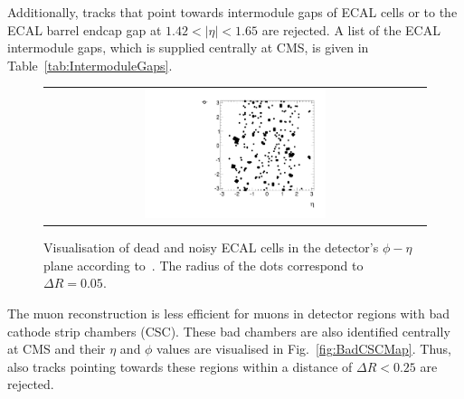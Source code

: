 Additionally, tracks that point towards intermodule gaps of ECAL cells or to the ECAL barrel endcap gap at $1.42<|\eta|<1.65$ are rejected.
A list of the ECAL intermodule gaps, which is supplied centrally at CMS, is given in Table~\ref{tab:IntermoduleGaps}.

\begin{figure}[!t]
  \centering 
  \begin{tabular}{c}
    \includegraphics[width=0.49\textwidth]{figures/analysis/DeadECALMap2.pdf}
  \end{tabular}
  \caption{Visualisation of dead and noisy ECAL cells in the detector's $\phi - \eta$ plane according to~\cite{bib:CMS:DT_Thesis,bib:CMS:DT_8TeV_AN}.
           The radius of the dots correspond to $\Delta R=0.05$.}
  \label{fig:DeadECALmap}
\end{figure}




The muon reconstruction is less efficient for muons in detector regions with bad cathode strip chambers (CSC).
These bad chambers are also identified centrally at CMS and their $\eta$ and $\phi$ values are visualised in Fig.~\ref{fig:BadCSCMap}.
Thus, also tracks pointing towards these regions within a distance of $\Delta R<0.25$ are rejected.

\renewcommand{\arraystretch}{1.5}
\begin{table}[!t]
\vspace{20pt}
\centering
\caption{Intermodule ECAL gaps.}
\label{tab:IntermoduleGaps}
\vspace{50pt}
\end{table}  

